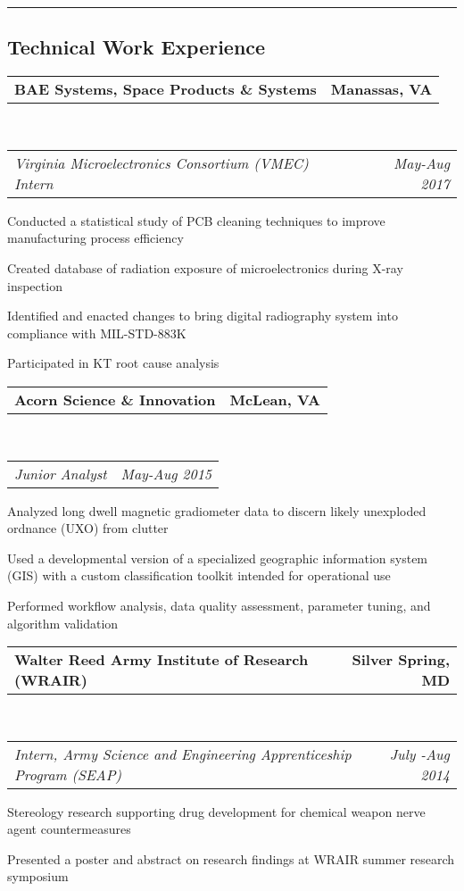 \documentclass[10pt,letterpaper]{article}
\makeatletter
\newcommand{\headerrow}[2]
{\begin{tabular*}{\linewidth}{l@{\extracolsep{\fill}}r}
	#1 &
	#2 \\
\end{tabular*}}
\makeatother
\begin{document}
\hrule
\vspace{-0.4em}
\subsection*{Technical Work Experience}
\headerrow
		{\textbf{BAE Systems, Space Products \& Systems}}
		{\textbf{Manassas, VA}}
	\\
	\headerrow
		{\emph{Virginia Microelectronics Consortium (VMEC) Intern}}
		{\emph{May-Aug 2017}}
\begin{itemize*}
		\item Conducted a statistical study of PCB cleaning techniques to improve manufacturing process efficiency
		\item Created database of radiation exposure of microelectronics during X-ray inspection
		\item Identified and enacted changes to bring digital radiography system into compliance with MIL-STD-883K
		\item Participated in KT root cause analysis
	\end{itemize*}
	\headerrow
		{\textbf{Acorn Science \& Innovation}}
		{\textbf{McLean, VA}}
	\\
	\headerrow
		{\emph{Junior Analyst}}
		{\emph{May-Aug 2015}}
	\begin{itemize*}
		\item Analyzed long dwell magnetic gradiometer data to
			discern likely unexploded ordnance (UXO) from clutter
		\item Used a developmental version of a specialized geographic information system (GIS) with 			a custom classification toolkit intended for operational use
		\item Performed workflow analysis, data
quality assessment, parameter tuning, and algorithm validation
	\end{itemize*}
	\headerrow
		{\textbf{Walter Reed Army Institute of Research (WRAIR)}}
		{\textbf{Silver Spring, MD}}
	\\
	\headerrow
		{\emph{Intern, Army Science and Engineering Apprenticeship Program (SEAP)}}
		{\emph{July -Aug 2014}}
	\begin{itemize*}
		\item Stereology research supporting drug development for chemical weapon nerve agent countermeasures
		\item Presented a poster and abstract on research findings at WRAIR summer research symposium
	\end{itemize*}
	
\end{document}
